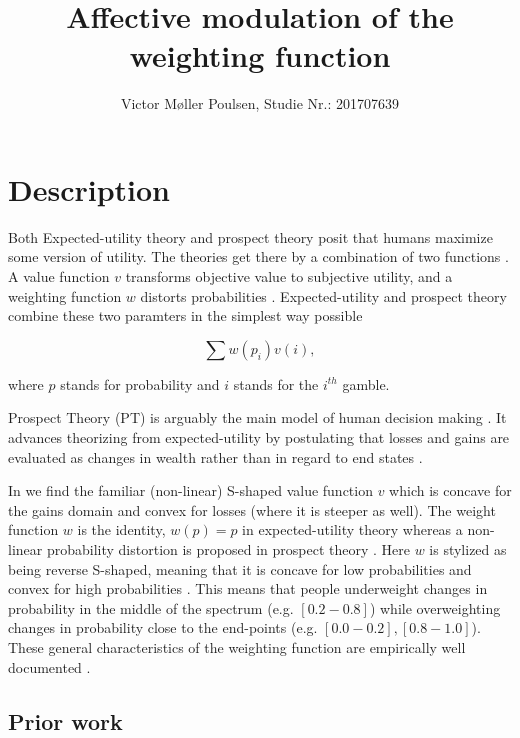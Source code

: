 \documentclass[12pt]{article}
\title{Affective modulation of the weighting function}
\author{Victor Møller Poulsen, Studie Nr.: 201707639}
\begin{document}
\maketitle
\leavevmode

\section{Description}
Both Expected-utility theory and prospect theory
posit that humans maximize some version of
utility. The theories get there by a
combination of two functions
\autocite{rottenstreich2001money}.
A value function $v$ transforms objective value to
subjective utility, and a weighting function $w$
distorts probabilities \autocite{rottenstreich2001money,
gonzalez1999shape}. Expected-utility and
prospect theory combine these two paramters in
the simplest way possible
\autocite{rottenstreich2001money}

\[
	\sum w(p_i)v(i),
\]

where $p$ stands for probability and $i$ stands for the
$i^{th}$ gamble.

Prospect Theory \autocite{PT,
tversky1992advances} (PT) is arguably the main model
of human decision making \autocite{
newell2015straight}. It advances theorizing
from expected-utility by postulating that losses and
gains are evaluated as changes in wealth rather
than in regard to end states \autocite{newell2015straight}.

\vspace{3mm}

In \textcite{PT} we find the familiar
(non-linear) S-shaped
value function $v$ which is concave for the gains
domain and convex for losses (where it is steeper as well).
The weight function $w$ is the identity,
$w(p) = p$ in expected-utility theory
\autocite{rottenstreich2001money} whereas
a non-linear probability distortion is proposed in
prospect theory \autocite{PT}. Here $w$
is stylized as being reverse S-shaped,
meaning that it is concave for low probabilities
and convex for high probabilities \textcite{
gonzalez1999shape}. This means that
people underweight changes in probability in
the middle of the spectrum (e.g. $[0.2-0.8]$)
while overweighting changes in probability close
to the end-points (e.g. $[0.0 - 0.2], [0.8 - 1.0]$).
These general characteristics of the weighting
function are empirically well documented
\autocite{tversky1992advances,
wu1996curvature}.

\subsection{Prior work}
\end{document}
